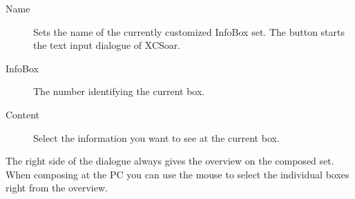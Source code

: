 \begin{description}
\item[Name]  Sets the name of the currently customized InfoBox set. The 
  button starts the text input dialogue of XCSoar.
\item[InfoBox]  The number identifying the current box.
\item[Content]  Select the information you want to see at the current box.
\end{description}

The right side of the dialogue always gives the overview on the composed set. When composing at the PC you can use the mouse to select the individual boxes right from the overview.





